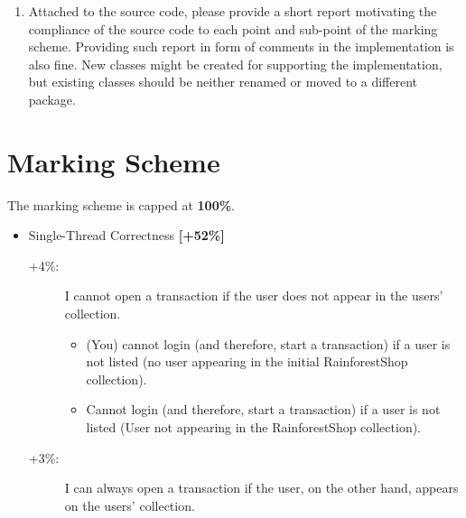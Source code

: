 \documentclass{article}
\begin{document}
\begin{enumerate}
		\item Attached to the source code, please provide a short report motivating the compliance of the source code to each point and sub-point of the marking scheme. Providing such report in form of comments in the implementation is also fine. New classes might be created for supporting the implementation, but  existing classes should be neither renamed or moved to a different package.
		
	\end{enumerate}


	\section*{Marking Scheme} 
\renewcommand{\labelitemii}{$\blacksquare$}
	The marking scheme is capped at  \textbf{100\%}.
	\begin{itemize}
		\item Single-Thread Correctness \textbf{[+52\%]}
			\begin{description}
			\item [+4\%:] I cannot open a transaction if the user does not appear in the users' collection.
\begin{itemize}
\item (You) cannot login (and therefore, start a transaction) if a user is not listed (no user appearing in the initial RainforestShop collection).
\item Cannot login (and therefore, start a transaction) if a user is not listed (User not appearing in the RainforestShop collection).
\end{itemize}
			\item [+3\%:] I can always open a transaction if the user, on the other hand, appears on the users' collection.


\end{description}
\end{itemize}
\end{document}
